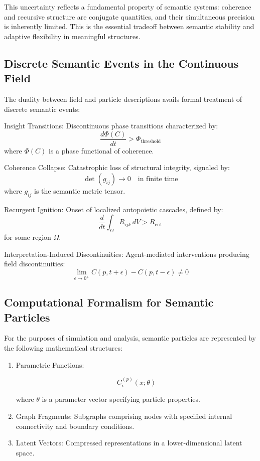 This uncertainty reflects a fundamental property of semantic systems: coherence and recursive structure are conjugate quantities, and their simultaneous precision is inherently limited. This is the essential tradeoff between semantic stability and adaptive flexibility in meaningful structures.

\subsection{Discrete Semantic Events in the Continuous Field}

The duality between field and particle descriptions avails formal treatment of discrete semantic events:

Insight Transitions: Discontinuous phase transitions characterized by:
\begin{equation}
\frac{d\Phi(C)}{dt} > \Phi_{\mathrm{threshold}}
\end{equation}
where \(\Phi(C)\) is a phase functional of coherence.

Coherence Collapse: Catastrophic loss of structural integrity, signaled by:
\begin{equation}
\det(g_{ij}) \to 0 \quad \text{in finite time}
\end{equation}
where \(g_{ij}\) is the semantic metric tensor.

Recurgent Ignition: Onset of localized autopoietic cascades, defined by:
\begin{equation}
\frac{d}{dt}\int_{\Omega} R_{ijk} \, dV > R_{\mathrm{crit}}
\end{equation}
for some region \(\Omega\).

Interpretation-Induced Discontinuities: Agent-mediated interventions producing field discontinuities:
\begin{equation}
\lim_{\epsilon \to 0^+} C(p, t+\epsilon) - C(p, t-\epsilon) \neq 0
\end{equation}

\subsection{Computational Formalism for Semantic Particles}

For the purposes of simulation and analysis, semantic particles are represented by the following mathematical structures:

\begin{enumerate}
    \item Parametric Functions:

    \begin{equation}
    C_i^{(p)}(x; \theta)
    \end{equation}

    where \(\theta\) is a parameter vector specifying particle properties.

    \item Graph Fragments: Subgraphs comprising nodes with specified internal connectivity and boundary conditions.

    \item Latent Vectors: Compressed representations in a lower-dimensional latent space.
\end{enumerate}

